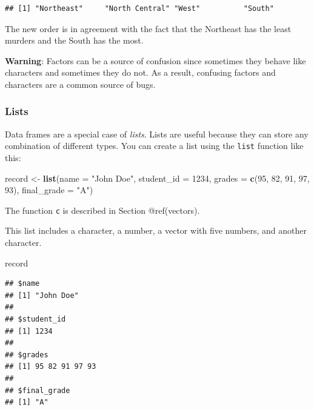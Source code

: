 \documentclass[
]{article}
\newenvironment{Shaded}{\begin{snugshade}}{\end{snugshade}}
\newcommand{\AttributeTok}[1]{\textcolor[rgb]{0.13,0.29,0.53}{#1}}
\newcommand{\DecValTok}[1]{\textcolor[rgb]{0.00,0.00,0.81}{#1}}
\newcommand{\FunctionTok}[1]{\textcolor[rgb]{0.13,0.29,0.53}{\textbf{#1}}}
\newcommand{\NormalTok}[1]{#1}
\newcommand{\OtherTok}[1]{\textcolor[rgb]{0.56,0.35,0.01}{#1}}
\newcommand{\StringTok}[1]{\textcolor[rgb]{0.31,0.60,0.02}{#1}}
\begin{document}
\begin{verbatim}
## [1] "Northeast"     "North Central" "West"          "South"
\end{verbatim}

The new order is in agreement with the fact that the Northeast has the
least murders and the South has the most.

\textbf{Warning}: Factors can be a source of confusion since sometimes
they behave like characters and sometimes they do not. As a result,
confusing factors and characters are a common source of bugs.

\subsubsection{Lists}\label{lists}

Data frames are a special case of \emph{lists}. Lists are useful because
they can store any combination of different types. You can create a list
using the \texttt{list} function like this:

\begin{Shaded}
\begin{Highlighting}[]
\NormalTok{record }\OtherTok{\textless{}{-}} \FunctionTok{list}\NormalTok{(}\AttributeTok{name =} \StringTok{"John Doe"}\NormalTok{,}
             \AttributeTok{student\_id =} \DecValTok{1234}\NormalTok{,}
             \AttributeTok{grades =} \FunctionTok{c}\NormalTok{(}\DecValTok{95}\NormalTok{, }\DecValTok{82}\NormalTok{, }\DecValTok{91}\NormalTok{, }\DecValTok{97}\NormalTok{, }\DecValTok{93}\NormalTok{),}
             \AttributeTok{final\_grade =} \StringTok{"A"}\NormalTok{)}
\end{Highlighting}
\end{Shaded}

The function \texttt{c} is described in Section @ref(vectors).

This list includes a character, a number, a vector with five numbers,
and another character.

\begin{Shaded}
\begin{Highlighting}[]
\NormalTok{record}
\end{Highlighting}
\end{Shaded}

\begin{verbatim}
## $name
## [1] "John Doe"
## 
## $student_id
## [1] 1234
## 
## $grades
## [1] 95 82 91 97 93
## 
## $final_grade
## [1] "A"
\end{verbatim}
\end{document}
